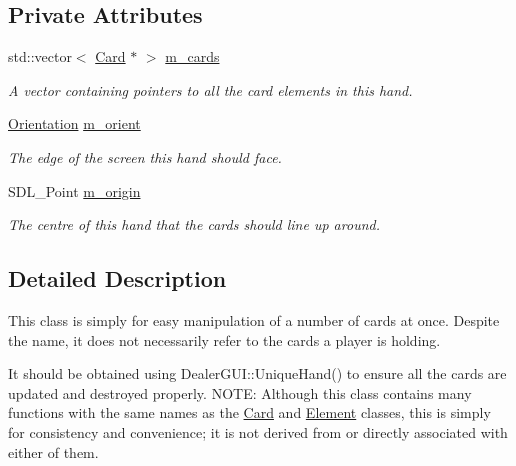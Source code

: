 \subsection*{Private Attributes}
\begin{DoxyCompactItemize}
\item 
std\-::vector$<$ \hyperlink{classGUI_1_1Card}{Card} $\ast$ $>$ \hyperlink{classGUI_1_1Hand_a59394b48b5a8f2f4e5aa05306964be35}{m\-\_\-cards}
\begin{DoxyCompactList}\small\item\em A vector containing pointers to all the card elements in this hand. \end{DoxyCompactList}\item 
\hyperlink{namespaceGUI_a1a3a8094d47f7be06ce123fab38abf6a}{Orientation} \hyperlink{classGUI_1_1Hand_aeb87f3ac6dd08799f2cbbb3c9444c2c4}{m\-\_\-orient}
\begin{DoxyCompactList}\small\item\em The edge of the screen this hand should face. \end{DoxyCompactList}\item 
S\-D\-L\-\_\-\-Point \hyperlink{classGUI_1_1Hand_a5993d2aadd4487e21a030fcbd67ada88}{m\-\_\-origin}
\begin{DoxyCompactList}\small\item\em The centre of this hand that the cards should line up around. \end{DoxyCompactList}\end{DoxyCompactItemize}


\subsection{Detailed Description}
This class is simply for easy manipulation of a number of cards at once. Despite the name, it does not necessarily refer to the cards a player is holding. 

It should be obtained using Dealer\-G\-U\-I\-::\-Unique\-Hand() to ensure all the cards are updated and destroyed properly. N\-O\-T\-E\-: Although this class contains many functions with the same names as the \hyperlink{classGUI_1_1Card}{Card} and \hyperlink{classGUI_1_1Element}{Element} classes, this is simply for consistency and convenience; it is not derived from or directly associated with either of them. 

